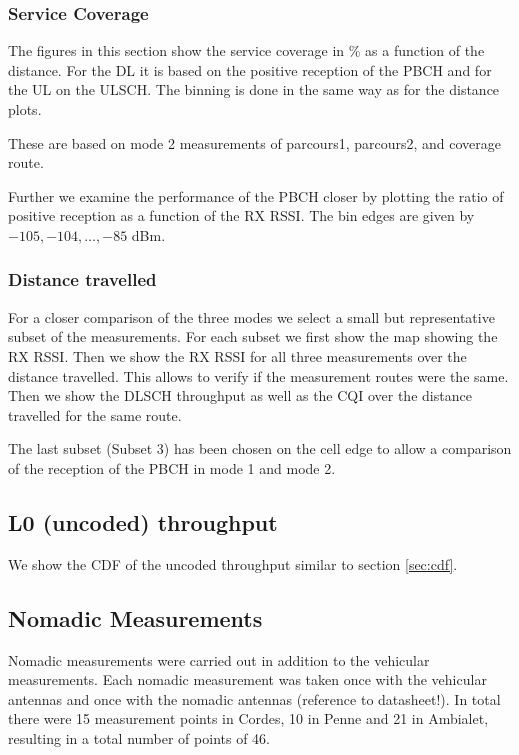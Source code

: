 \documentclass[a4paper,10pt]{article}
\begin{document}
\subsubsection{Service Coverage}

The figures in this section show the service coverage in \% as a function of the distance. For the DL it is based on the positive reception of the PBCH and for the UL on the ULSCH. The binning is done in the same way as for the distance plots.

These are based on mode 2 measurements of parcours1, parcours2, and coverage route. 

Further we examine the performance of the PBCH closer by plotting the ratio of positive reception as a function of the RX RSSI. The bin edges are given by  $-105, -104, \ldots, -85$ dBm.

\subsubsection{Distance travelled}
\label{sec:dist_travelled}

For a closer comparison of the three modes we select a small but representative subset of the measurements. For each subset we first show the map showing the RX RSSI. Then we show the RX RSSI for all three measurements over the distance travelled. This allows to verify if the measurement routes were the same. Then we show the DLSCH throughput as well as the CQI over the distance travelled for the same route. 

The last subset (Subset 3) has been chosen on the cell edge to allow a comparison of the reception of the PBCH in mode 1 and mode 2.



\subsection{L0 (uncoded) throughput}

We show the CDF of the uncoded throughput similar to section \ref{sec:cdf}.

\subsection{Nomadic Measurements}

Nomadic measurements were carried out in addition to the vehicular measurements. Each nomadic measurement was taken once with the vehicular antennas and once with the nomadic antennas (reference to datasheet!). In total there were 15 measurement points in Cordes, 10 in Penne and 21 in Ambialet, resulting in a total number of points of 46.
\end{document}

